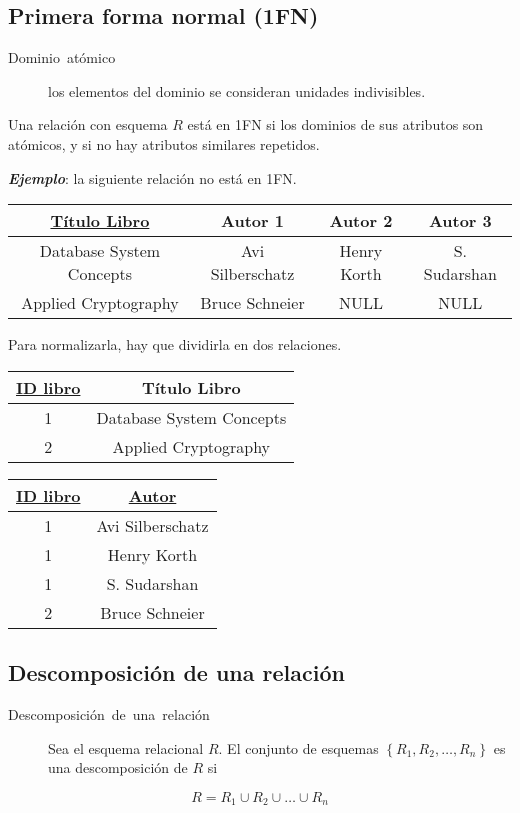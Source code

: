 \documentclass[a4paper, twoside]{article}
\begin{document}
\subsection{Primera forma normal (1FN)}
\begin{description}
\item [{Dominio~atómico}] los elementos del dominio se consideran unidades
indivisibles.
\end{description}
Una relación con esquema $R$ está en 1FN si los dominios de sus atributos
son atómicos, y si no hay atributos similares repetidos.

\textbf{\emph{Ejemplo}}: la siguiente relación no está en 1FN.

\begin{tabular}{|c|c|c|c|}
\hline 
\uline{Título Libro} & Autor 1 & Autor 2 & Autor 3\\
\hline 
\hline 
Database System Concepts & Avi Silberschatz & Henry Korth & S. Sudarshan\\
\hline 
Applied Cryptography & Bruce Schneier & NULL & NULL\\
\hline 
\end{tabular}

Para normalizarla, hay que dividirla en dos relaciones.

\begin{tabular}{|c|c|}
\hline 
\uline{ID libro} & Título Libro\\
\hline 
\hline 
1 & Database System Concepts\\
\hline 
2 & Applied Cryptography\\
\hline 
\end{tabular}

\begin{tabular}{|c|c|}
\hline 
\uline{ID libro} & \uline{Autor}\\
\hline 
\hline 
1 & Avi Silberschatz\\
\hline 
1 & Henry Korth\\
\hline 
1 & S. Sudarshan\\
\hline 
2 & Bruce Schneier\\
\hline 
\end{tabular}


\subsection{Descomposición de una relación}
\begin{description}
\item [{Descomposición~de~una~relación}] Sea el esquema relacional $R$.
El conjunto de esquemas $\left\{ R_{1},R_{2},\dots,R_{n}\right\} $
es una descomposición de $R$ si
\end{description}
\[
R=R_{1}\cup R_{2}\cup\dots\cup R_{n}
\]
\end{document}
